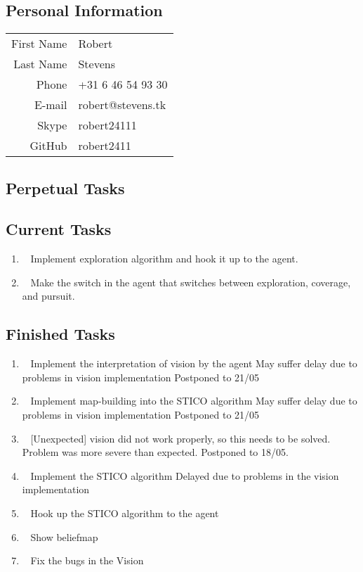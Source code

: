 \subsection{Personal Information}
\begin{table}[h!]
	\begin{tabular}{rl}
	First Name 	& Robert\\
	Last Name	& Stevens\\
	Phone		& +31 6 46 54 93 30\\
	E-mail		& robert@stevens.tk\\
	Skype		& robert24111\\
	GitHub		& robert2411
\end{tabular}
\end{table}

\subsection{Perpetual Tasks}

\subsection{Current Tasks}
	\begin{enumerate}
		\item~
			Implement exploration algorithm and hook it up to the agent.
		\item~
			Make the switch in the agent that switches between exploration, coverage, and pursuit.
	\end{enumerate}

\subsection{Finished Tasks}
	\begin{enumerate}
		\item~
		Implement the interpretation of vision by the agent
			\subitem May suffer delay due to problems in vision implementation
			\subitem Postponed to 21/05
		\item~
		Implement map-building into the STICO algorithm
			\subitem May suffer delay due to problems in vision implementation
			\subitem Postponed to 21/05
		\item~
		[Unexpected] vision did not work properly, so this needs to be solved.
			\subitem Problem was more severe than expected. Postponed to 18/05.
		\item~
		Implement the STICO algorithm
			\subitem Delayed due to problems in the vision implementation
		\item~
		Hook up the STICO algorithm to the agent
		\item~\marginpar{-}
			Show beliefmap
		\item~
			Fix the bugs in the Vision
	\end{enumerate}

